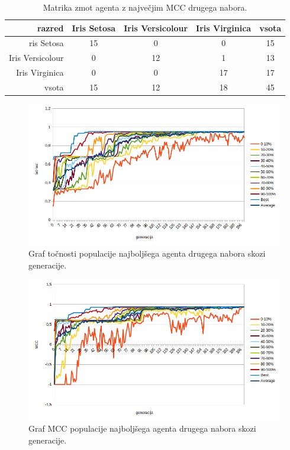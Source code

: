 \begin{table}[H]
    \centering
    \caption{Matrika zmot agenta z največjim MCC drugega nabora.}
    \begin{tabular}{||rcccc||}
        \hline
        razred           & Iris Setosa & Iris Versicolour & Iris Virginica & vsota \\ \hline
        ris Setosa       & 15          & 0                & 0              & 15    \\ \hline
        Iris Versicolour & 0           & 12               & 1              & 13    \\ \hline
        Iris Virginica   & 0           & 0                & 17             & 17    \\ \hline
        vsota            & 15          & 12               & 18             & 45    \\ \hline
    \end{tabular}
    \label{tab:iris_mcc_2}
\end{table}

\begin{figure}[H]
    \begin{center}
        \includegraphics[width=13cm]{iris/2/acc}
    \end{center}
    \caption{Graf točnosti populacije najboljšega agenta drugega nabora skozi generacije.}
    \label{fig:iris_acc_2}
\end{figure}

\begin{figure}[H]
    \begin{center}
        \includegraphics[width=13cm]{iris/2/mcc}
    \end{center}
    \caption{Graf MCC populacije najboljšega agenta drugega nabora skozi generacije.}
    \label{fig:iris_mcc_2}
\end{figure}

